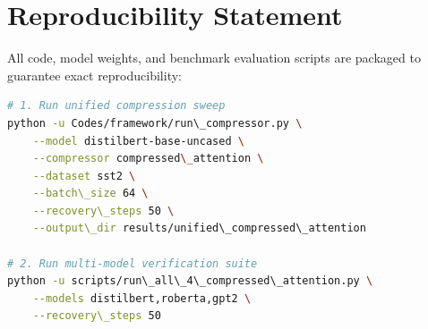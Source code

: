 \section{Reproducibility Statement}
All code, model weights, and benchmark evaluation scripts are packaged to guarantee exact reproducibility:
\begin{lstlisting}[language=bash]
# 1. Run unified compression sweep
python -u Codes/framework/run\_compressor.py \
    --model distilbert-base-uncased \
    --compressor compressed\_attention \
    --dataset sst2 \
    --batch\_size 64 \
    --recovery\_steps 50 \
    --output\_dir results/unified\_compressed\_attention

# 2. Run multi-model verification suite
python -u scripts/run\_all\_4\_compressed\_attention.py \
    --models distilbert,roberta,gpt2 \
    --recovery\_steps 50
\end{lstlisting}
